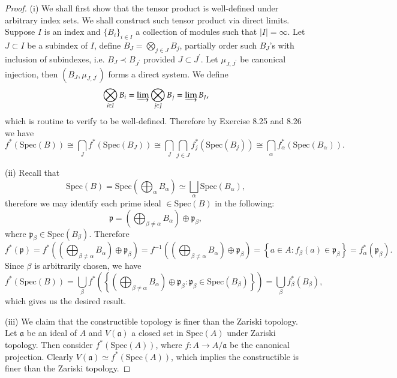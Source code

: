 \begin{proof}
(i) We shall first show that the tensor product is well-defined under arbitrary index sets. We shall construct such tensor product via direct limits. Suppose $I$ is an index and $\{B_i\}_{i\in I}$ a collection of modules such that $|I|=\infty$. Let $J\subset I$ be a subindex of $I$, define $B_J=\bigotimes_{j\in J}B_j$, partially order such $B_J$'s with inclusion of subindexes, i.e. $B_J\prec B_{J^\prime}$ provided $J\subset J^\prime$. Let $\mu_{J,J^\prime}$ be canonical injection, then $(B_J,\mu_{J,J^\prime})$ forms a direct system. We define 
$$
\bigotimes_{i\in I}{B_i}=\varinjlim\bigotimes_{j\in J}{B_j}=\varinjlim B_J,
$$
which is routine to verify to be well-defined. Therefore by Exercise 8.25 and 8.26 we have 
$$
f^*\left( \mathrm{Spec}\left( B \right) \right) \cong \bigcap_J{f^*\left( \mathrm{Spec}\left( B_J \right) \right)}\cong \bigcap_J{\bigcap_{j\in J}{f_{j}^{*}\left( \mathrm{Spec}\left( B_j \right) \right)}}\cong \bigcap_{\alpha}{f_{\alpha}^{*}\left( \mathrm{Spec}\left( B_{\alpha} \right) \right)}.
$$\par
(ii) Recall that 
$$
\mathrm{Spec}\left( B \right) =\mathrm{Spec}\left( \bigoplus_{\alpha}{B_{\alpha}} \right) \simeq \bigsqcup_{\alpha}{\mathrm{Spec}\left( B_{\alpha} \right)},
$$
therefore we may identify each prime ideal $\mathfrak\in\mathrm{Spec}(B)$ in the following: 
$$
\mathfrak{p} =\left( \bigoplus_{\beta \ne \alpha}{B_{\alpha}} \right) \oplus \mathfrak{p} _{\beta},
$$
where $\mathfrak{p}_\beta\in\mathrm{Spec}(B_\beta)$. Therefore 
$$
f^*\left( \mathfrak{p} \right) =f^*\left( \left( \bigoplus_{\beta \ne \alpha}{B_{\alpha}} \right) \oplus \mathfrak{p} _{\beta} \right) =f^{-1}\left( \left( \bigoplus_{\beta \ne \alpha}{B_{\alpha}} \right) \oplus \mathfrak{p} _{\beta} \right) =\left\{ a\in A:f_{\beta}\left( a \right) \in \mathfrak{p} _{\beta} \right\} =f_{\alpha}^{*}\left( \mathfrak{p} _{\beta} \right) .
$$
Since $\beta$ is arbitrarily chosen, we have 
$$
f^*\left( \mathrm{Spec}\left( B \right) \right) =\bigcup_{\beta}{f^*\left( \left\{ \left( \bigoplus_{\beta \ne \alpha}{B_{\alpha}} \right) \oplus \mathfrak{p} _{\beta}:\mathfrak{p} _{\beta}\in \mathrm{Spec}\left( B_{\beta} \right) \right\} \right)}=\bigcup_{\beta}{f_{\beta}^{*}\left( B_{\beta} \right)},
$$
which gives us the desired result.\par
(iii) We claim that the constructible topology is finer than the Zariski topology. Let $\mathfrak{a}$ be an ideal of $A$ and $V(\mathfrak{a})$ a closed set in $\mathrm{Spec}(A)$ under Zariski topology. Then consider $f^*(\mathrm{Spec}(A))$, where $f:A\to A/\mathfrak{a}$ be the canonical projection. Clearly $V(\mathfrak{a})\simeq f^*(\mathrm{Spec}(A))$, which implies the constructible is finer than the Zariski topology.\par

\end{proof}
